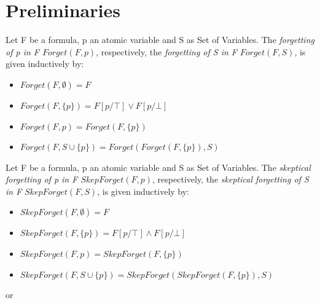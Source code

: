 \section{Preliminaries}
\begin{definition}
                    Let F be a formula, p an atomic variable and S as Set of Variables. The \emph{forgetting of p in F $\mathit{Forget}(F,p)$}, respectively, the \emph{forgetting of S in F} $Forget(F,S)$, is given inductively by:
                \end{definition}

                \begin{itemize}
                  \item $\mathit{Forget(F,\emptyset)} = F$ 
                  \item $\mathit{Forget(F,\{p\})} = F[p/\top] \lor F[p/\bot]$
                  \item $\mathit{Forget}(F,p) = \mathit{Forget}(F,\{p\})$
                  \item $\mathit{Forget(F,S \cup \{p\})} = \mathit{Forget(Forget(F,\{p\}), S)}$
                \end{itemize}\begin{definition}
                    Let F be a formula, p an atomic variable and S as Set of Variables. The \emph{skeptical forgetting of p in F $\mathit{SkepForget}(F,p)$}, respectively, the \emph{skeptical forgetting of S in F} $\mathit{SkepForget(F,S)}$, is given inductively by:
                \end{definition}
        
                \begin{itemize}
                  \item $\mathit{SkepForget(F,\emptyset)} = F$
                  \item $\mathit{SkepForget(F,\{p\})} = F[p/\top] \land F[p/\bot]$
                    \item $\mathit{SkepForget}(F,p) = \mathit{SkepForget}(F,\{p\})$
                  \item $\mathit{SkepForget(F,S \cup \{p\})} = \mathit{SkepForget(SkepForget(F,\{p\}), S)}$
                \end{itemize}\cite{lin1994forget} or \cite{lang2003propositional}